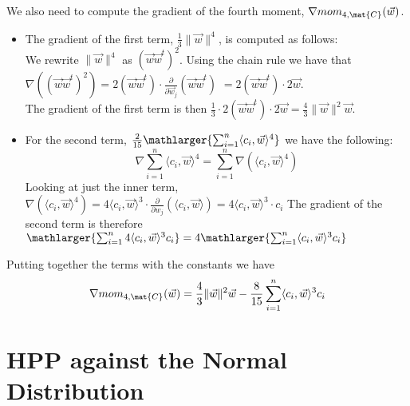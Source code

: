 We also need to compute the gradient of the fourth moment, $\nabla mom_{4, \mat{C}} (\vec{w})$.
\begin{itemize}
    \item The gradient of the first term, $\frac{1}{3} \lVert \vec{w} \rVert ^4$, is computed as follows: \\
        We rewrite $\lVert \vec{w} \rVert ^4$ as $(\vec{w}\vec{w}^t)^2$. Using the chain rule we have that \\
        $\nabla ((\vec{w}\vec{w}^t)^2) = 2(\vec{w}\vec{w}^t) \cdot \frac{\partial}{\partial \vec{w}_j}(\vec{w}\vec{w}^t)$
        $= 2(\vec{w}\vec{w}^t) \cdot 2 \vec{w}$. \\ 
        The gradient of the first term is then $\frac{1}{3} \cdot 2(\vec{w}\vec{w}^t) \cdot 2 \vec{w} = \frac{4}{3} \lVert \vec{w} \rVert ^2 \vec{w}$.
    \item For the second term, $\frac{2}{15} \mathlarger{\sum_{i=1}^{n} \langle c_i, \vec{w} \rangle ^4}$ we have the following:
        \[\nabla \sum_{i=1}^{n}\langle c_i, \vec{w} \rangle ^4 = \sum_{i=1}^{n}\nabla (\langle c_i, \vec{w} \rangle ^4)\]
        Looking at just the inner term, $\nabla (\langle c_i, \vec{w} \rangle ^4) = 4 \langle c_i, \vec{w} \rangle ^3 
        \cdot \frac{\partial}{\partial w_j} (\langle c_i, \vec{w} \rangle) = 4 \langle c_i, \vec{w} \rangle ^3 \cdot c_i$
        The gradient of the second term is therefore $\mathlarger{\sum_{i=1}^{n} 4 \langle c_i, \vec{w} \rangle ^3 c_i} 
        = 4 \mathlarger{\sum_{i=1}^{n} \langle c_i, \vec{w} \rangle ^3 c_i}$
\end{itemize}
Putting together the terms with the constants we have 
    \[ \nabla mom_{4, \mat{C}}(\vec{w}) =  \frac{4}{3} \lVert \vec{w} \rVert ^2 \vec{w} - \frac{8}{15} \sum_{i=1}^{n} \langle c_i, \vec{w} \rangle ^3 c_i\]

\section{HPP against the Normal Distribution}

